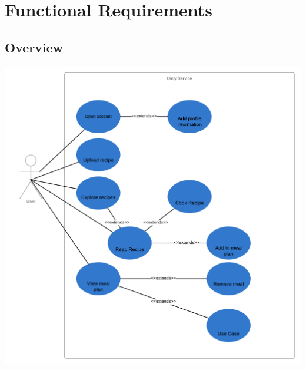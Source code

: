 \documentclass[12pt]{article}
\newcommand{\comment}[1]{}
\theoremstyle{definition}
\newenvironment{explanation}{%
   \setlength{\parindent}{0pt}
   \itshape
   \color{blue}
}{}
\begin{document}
\section{Functional Requirements}
\comment{
    \begin{explanation}
    Functional requirements describe the features of a system which are expected by a user in order to solve a specific problem. The requirements are derived from the business processes and work flows which are supported by the system.
    
    The description of functional requirements is accomplished by means of use cases. A use case describes a concrete and self-contained process. The sum of all use cases describes the system behaviour. Describe use cases in plain text and support it by provide clear and illustrative use case diagrams.
    In case of a very data-oriented application provide a first version of a data model (business domain model). This model is the basis for the data base design in a later project stage. The data model is derived from the entities of the domain model.
    \end{explanation}
}

\subsection{Overview}
\begin{center}
    \includegraphics[width=1.1\textwidth]{res/images/UseCaseDiagram.png}
\end{center}
\end{document}
